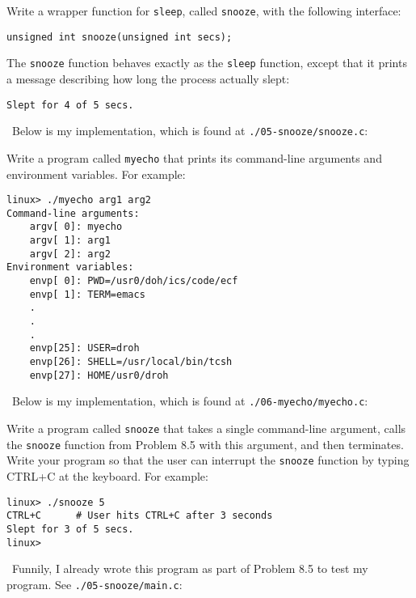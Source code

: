\documentclass[12pt]{article}
\newenvironment{ex}[2][Exercise]{\begin{trivlist}
		\item[\hskip \labelsep {\bfseries #1}\hskip \labelsep {\bfseries #2.}]}{\end{trivlist}}
\newenvironment{sol}[1][Solution]{\begin{trivlist}
		\item[\hskip \labelsep {\bfseries #1:}]}{\end{trivlist}}
\begin{document}
\begin{ex}{8.5}
	Write a wrapper function for \texttt{sleep}, called \texttt{snooze}, with the following
	interface:
	\begin{lstlisting}
unsigned int snooze(unsigned int secs);
	\end{lstlisting}
	The \texttt{snooze} function behaves exactly as the \texttt{sleep} function, except that
	it prints a message describing how long the process actually slept:
	\begin{lstlisting}[language={}]
Slept for 4 of 5 secs.
	\end{lstlisting}
\end{ex}

\begin{sol}
	\
	Below is my implementation, which is found at \texttt{./05-snooze/snooze.c}:
	
\end{sol}

\begin{ex}{8.6}
	Write a program called \texttt{myecho} that prints its command-line arguments and environment
	variables. For example:
	\begin{lstlisting}[language={}]
linux> ./myecho arg1 arg2
Command-line arguments:
	argv[ 0]: myecho
	argv[ 1]: arg1
	argv[ 2]: arg2
Environment variables:
	envp[ 0]: PWD=/usr0/doh/ics/code/ecf
	envp[ 1]: TERM=emacs
	.
	.
	.
	envp[25]: USER=droh
	envp[26]: SHELL=/usr/local/bin/tcsh
	envp[27]: HOME/usr0/droh
	\end{lstlisting}
\end{ex}

\begin{sol}
	\
	Below is my implementation, which is found at \texttt{./06-myecho/myecho.c}:
	
\end{sol}

\begin{ex}{8.7}
	Write a program called \texttt{snooze} that takes a single command-line argument, calls the
	\texttt{snooze} function from Problem 8.5 with this argument, and then terminates. Write your
	program so that the user can interrupt the \texttt{snooze} function by typing CTRL+C at the
	keyboard. For example:
	\begin{lstlisting}[language={}]
linux> ./snooze 5
CTRL+C		# User hits CTRL+C after 3 seconds
Slept for 3 of 5 secs.
linux>
	\end{lstlisting}
\end{ex}

\begin{sol}
	\
	Funnily, I already wrote this program as part of Problem 8.5 to test my program. See
	\texttt{./05-snooze/main.c}:
	
\end{sol}
\end{document}
